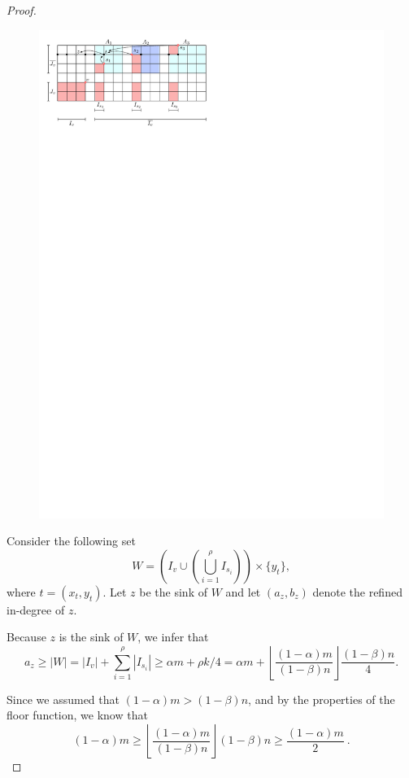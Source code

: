 \documentclass[a4paper,10pt]{article}
\newcommand{\indegree}{refined in-degree\xspace}
\begin{document}
\begin{proof}
\begin{figure}[h]
\centering
\includegraphics{expansion_lemma_fig2.pdf}
\caption{\small }
\label{fig:Expansion Case 2}
\end{figure}

Consider the following set $$W = \left(I_v\cup \left(\bigcup_{i=1}^\rho I_{s_i}\right)\right)\times \{y_t\},$$
where $t = (x_t, y_t)$.
Let $z$ be the sink of $W$ and let $(a_z, b_z)$ denote the \indegree of $z$.

Because $z$ is the sink of $W$, we infer that 
$$a_z \geq |W|  = |I_v| + \sum_{i=1}^\rho |I_{s_i}| \geq
\alpha m + \rho k/4  = \alpha m +  \left\lfloor \frac{(1-\alpha)m}{(1-\beta)n} \right\rfloor \frac{(1-\beta) n}{4}.$$

Since we assumed that $(1 - \alpha) m > (1-\beta) n$, and by the properties of the floor function, we know that $$(1 - \alpha) m \geq \left \lfloor \frac{(1-\alpha)m}{(1-\beta)n} \right \rfloor (1-\beta)n \geq \frac{(1 - \alpha) m}{2} \ .$$


\end{proof}
\end{document}
